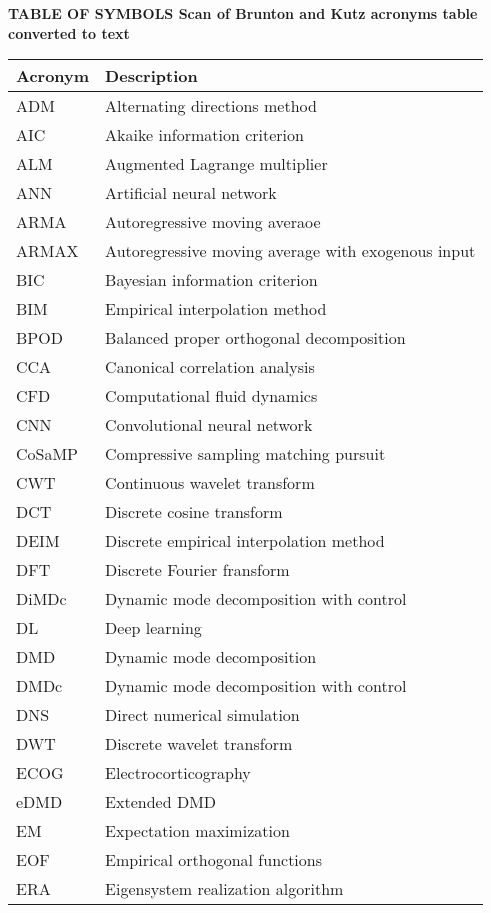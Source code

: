 \begin{table}[h]
\textbf{\textsf{TABLE OF SYMBOLS}
Scan of Brunton and Kutz acronyms table converted to text
}
\begin{center}
\begin{tabular}{|p{4.0cm}|p{12.0cm}|}
\hline
\textbf{\textsf{Acronym}}
& \textbf{\textsf{Description}} \\
\hline
ADM  & Alternating directions method \\
AIC  & Akaike information criterion \\
ALM  & Augmented Lagrange multiplier \\
ANN  & Artificial neural network \\
ARMA  & Autoregressive moving averaoe \\
ARMAX  & Autoregressive moving average with exogenous input \\
BIC  & Bayesian information criterion \\
BIM  & Empirical interpolation method \\
BPOD  & Balanced proper orthogonal decomposition \\
CCA  & Canonical correlation analysis \\
CFD  & Computational fluid dynamics \\
CNN  & Convolutional neural network \\
CoSaMP  & Compressive sampling matching pursuit \\
CWT  & Continuous wavelet transform \\
DCT  & Discrete cosine transform \\
DEIM  & Discrete empirical interpolation method \\
DFT  & Discrete Fourier fransform \\
DiMDc  & Dynamic mode decomposition with control \\
DL  & Deep learning \\
DMD  & Dynamic mode decomposition \\
DMDc  & Dynamic mode decomposition with control \\
DNS  & Direct numerical simulation \\
DWT  & Discrete wavelet transform \\
ECOG  & Electrocorticography \\
eDMD  & Extended DMD \\
EM  & Expectation maximization \\
EOF  & Empirical orthogonal functions \\
ERA  & Eigensystem realization algorithm \\

\end{tabular}
\end{center}
\end{table}
